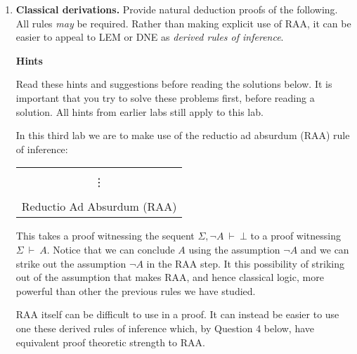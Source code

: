 \documentclass[11pt]{report}
\newcommand{\temp}[2]{{\overline{#2}}^{#1}}
\begin{document}
\begin{enumerate}
\begin{enumerate}
			\begin{center}
				$\begin{array}{c}
					\infer[\lor E]{A}
						{\temp{\text{LEM}}{A \lor \lnot A}
						&
						A \to A
						&
						\infer[\to I,1]{\lnot A \to A}
							{\infer[\XF]{A}
								{\infer[\MP]{\bot}
									{\infer[1]{\cancel{\lnot A}}{}
									&
									\lnot \lnot A}}}}
				\end{array}$
			\end{center}
	\end{enumerate}
	
	\newpage
	\item \textbf{Classical derivations.} Provide natural deduction proofs of the following. All rules \emph{may} be required. Rather than making explicit use of RAA, it can be easier to appeal to LEM or DNE as \emph{derived rules of inference}. 
	
	\textbf{Hints}

	Read these hints and suggestions before reading the solutions below. It is important that you try to solve these problems first, before reading a solution. All hints from earlier labs still apply to this lab. 

	In this third lab we are to make use of the reductio ad absurdum (RAA) rule of inference: 

	\begin{center}
	\begin{tabular}{c}
		\infer[\RAA]{A}{\begin{array}{c}\Sigma, \lnot A \\ \vdots \\ \bot \end{array}}
		\\
		Reductio Ad Absurdum (RAA)
	\end{tabular}
	\end{center}

	This takes a proof witnessing the sequent $\Sigma, \lnot A \ \vdash \ \bot$ to a proof witnessing $\Sigma \ \vdash \ A$. Notice that we can conclude $A$ using the assumption $\lnot A$ and we can strike out the assumption $\lnot A$ in the RAA step. It this possibility of striking out of the assumption that makes RAA, and hence classical logic, more powerful than other the previous rules we have studied. 

	RAA itself can be difficult to use in a proof. It can instead be easier to use one these derived rules of inference which, by Question 4 below, have equivalent proof theoretic strength to RAA. 
	

\end{enumerate}
\end{document}
